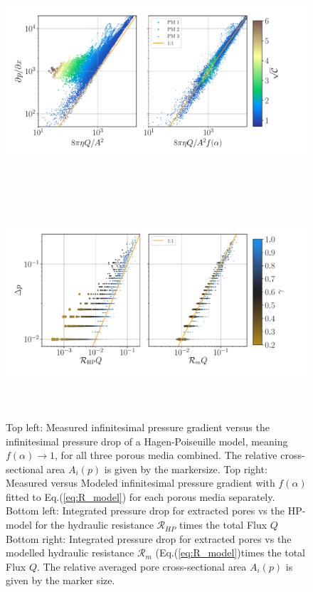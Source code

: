 \documentclass[draft]{agujournal2019}
\begin{document}
\begin{figure}
\includegraphics[height=8cm]{figures/infi_dpdx_combined.pdf}
\includegraphics[height=8cm]{figures/integral_dp_combined.pdf}
\caption{Top left: Measured infinitesimal pressure gradient versus the infinitesimal pressure drop of a Hagen-Poiseuille model, meaning $f(\alpha)\rightarrow 1$, for all three porous media combined. The relative cross-sectional area $A_i(p)$ is given by the markersize. Top right: Measured versus Modeled infinitesimal pressure gradient with $f(\alpha)$ fitted to Eq.(\ref{eq:R_model}) for each porous media separately. Bottom left: Integrated pressure drop for extracted pores vs the HP-model for the hydraulic resistance $\mathcal{R}_{HP}$ times the total Flux $Q$ Bottom right: Integrated pressure drop for extracted pores vs the modelled hydraulic resistance $\mathcal{R}_m$ (Eq.(\ref{eq:R_model})times the total Flux $Q$. The relative averaged pore cross-sectional area $A_i(p)$ is given by the marker size.}
\label{fig:local_and_integrated}
\end{figure}
\end{document}
